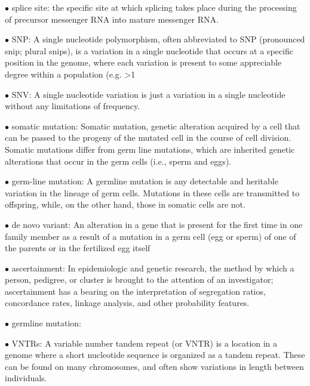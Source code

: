 \documentclass{article}
\begin{document}
\vspace{0.1in}
$\bullet$ splice site:
the specific site at which splicing takes place during the processing of precursor messenger RNA into mature messenger RNA.

\vspace{0.1in}
$\bullet$ SNP:
A single nucleotide polymorphism, often abbreviated to SNP (pronounced snip; plural snips), is a variation in a single nucleotide that occurs at a specific position in the genome, where each variation is present to some appreciable degree within a population (e.g. >1%

\vspace{0.1in}
$\bullet$ SNV:
A single nucleotide variation is just a variation in a single nucleotide without any limitations of frequency. 

\vspace{0.1in}
$\bullet$ somatic mutation:
Somatic mutation, genetic alteration acquired by a cell that can be passed to the progeny of the mutated cell in the course of cell division. Somatic mutations differ from germ line mutations, which are inherited genetic alterations that occur in the germ cells (i.e., sperm and eggs).

\vspace{0.1in}
$\bullet$ germ-line mutation:
A germline mutation is any detectable and heritable variation in the lineage of germ cells. Mutations in these cells are transmitted to offspring, while, on the other hand, those in somatic cells are not.

\vspace{0.1in}
$\bullet$ de novo variant:
An alteration in a gene that is present for the first time in one family member as a result of a mutation in a germ cell (egg or sperm) of one of the parents or in the fertilized egg itself

\vspace{0.1in}
$\bullet$ ascertainment:
In epidemiologic and genetic research, the method by which a person, pedigree, or cluster is brought to the attention of an investigator; ascertainment has a bearing on the interpretation of segregation ratios, concordance rates, linkage analysis, and other probability features.

\vspace{0.1in}
$\bullet$ germline mutation:


\vspace{0.1in}
$\bullet$ VNTRs:
A variable number tandem repeat (or VNTR) is a location in a genome where a short nucleotide sequence is organized as a tandem repeat. These can be found on many chromosomes, and often show variations in length between individuals.
\end{document}
